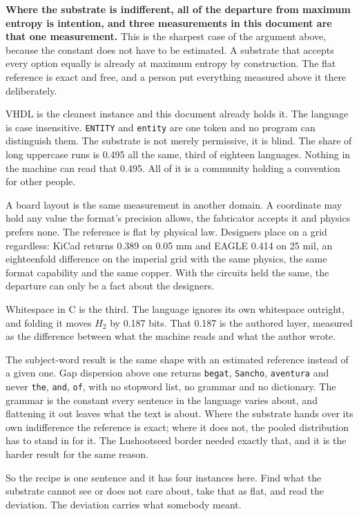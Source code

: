 \textbf{Where the substrate is indifferent, all of the departure from maximum entropy is intention, and three measurements in this document are that one measurement.} This is the sharpest case of the argument above, because the constant does not have to be estimated. A substrate that accepts every option equally is already at maximum entropy by construction. The flat reference is exact and free, and a person put everything measured above it there deliberately.

VHDL is the cleanest instance and this document already holds it. The language is case insensitive. \texttt{ENTITY} and \texttt{entity} are one token and no program can distinguish them. The substrate is not merely permissive, it is blind. The share of long uppercase runs is 0.495 all the same, third of eighteen languages. Nothing in the machine can read that 0.495. All of it is a community holding a convention for other people.

A board layout is the same measurement in another domain. A coordinate may hold any value the format's precision allows, the fabricator accepts it and physics prefers none. The reference is flat by physical law. Designers place on a grid regardless: KiCad returns 0.389 on 0.05 mm and EAGLE 0.414 on 25 mil, an eighteenfold difference on the imperial grid with the same physics, the same format capability and the same copper. With the circuits held the same, the departure can only be a fact about the designers.

Whitespace in C is the third. The language ignores its own whitespace outright, and folding it moves \(H_2\) by 0.187 bits. That 0.187 is the authored layer, measured as the difference between what the machine reads and what the author wrote.

The subject-word result is the same shape with an estimated reference instead of a given one. Gap dispersion above one returns \texttt{begat}, \texttt{Sancho}, \texttt{aventura} and never \texttt{the}, \texttt{and}, \texttt{of}, with no stopword list, no grammar and no dictionary. The grammar is the constant every sentence in the language varies about, and flattening it out leaves what the text is about. Where the substrate hands over its own indifference the reference is exact; where it does not, the pooled distribution has to stand in for it. The Lushootseed border needed exactly that, and it is the harder result for the same reason.

So the recipe is one sentence and it has four instances here. Find what the substrate cannot see or does not care about, take that as flat, and read the deviation. The deviation carries what somebody meant.

